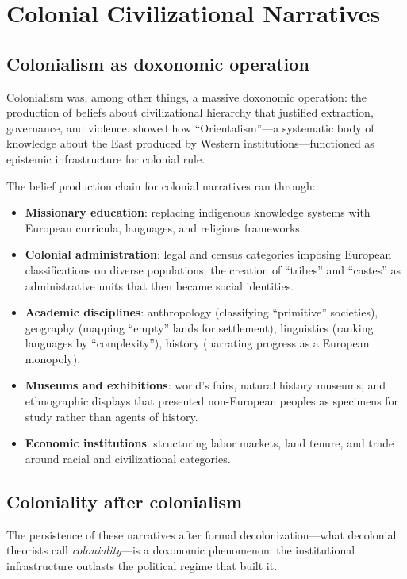 \section{Colonial Civilizational Narratives}
\label{sec:ch24b-coloniality}

\subsection{Colonialism as doxonomic operation}

Colonialism was, among other things, a massive doxonomic operation: the production of beliefs about civilizational hierarchy that justified extraction, governance, and violence.
\textcite{said1978} showed how ``Orientalism''---a systematic body of knowledge about the East produced by Western institutions---functioned as epistemic infrastructure for colonial rule.

The belief production chain for colonial narratives ran through:
\begin{itemize}[nosep]
  \item \textbf{Missionary education}: replacing indigenous knowledge systems with European curricula, languages, and religious frameworks.
  \item \textbf{Colonial administration}: legal and census categories imposing European classifications on diverse populations; the creation of ``tribes'' and ``castes'' as administrative units that then became social identities.
  \item \textbf{Academic disciplines}: anthropology (classifying ``primitive'' societies), geography (mapping ``empty'' lands for settlement), linguistics (ranking languages by ``complexity''), history (narrating progress as a European monopoly).
  \item \textbf{Museums and exhibitions}: world's fairs, natural history museums, and ethnographic displays that presented non-European peoples as specimens for study rather than agents of history.
  \item \textbf{Economic institutions}: structuring labor markets, land tenure, and trade around racial and civilizational categories.
\end{itemize}

\subsection{Coloniality after colonialism}

The persistence of these narratives after formal decolonization---what decolonial theorists call \emph{coloniality}---is a doxonomic phenomenon: the institutional infrastructure outlasts the political regime that built it.


